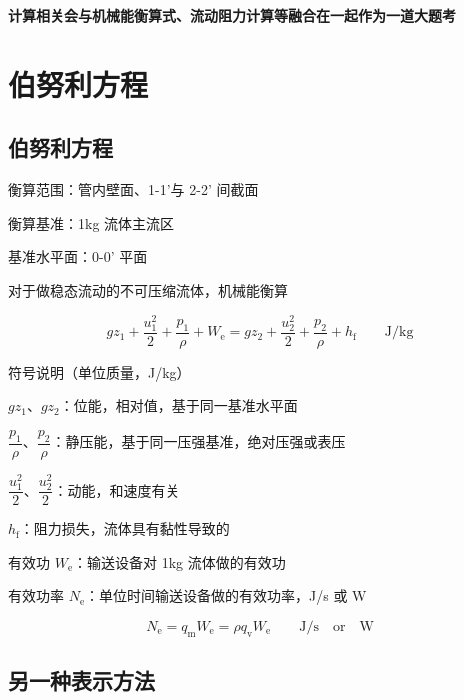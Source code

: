 \documentclass{book}
\DeclareRobustCommand{\bluebold}[1]{\textbf{\textcolor[rgb]{0.31,0.63,0.86}{#1}}}
\begin{document}
\bluebold{计算相关会与机械能衡算式、流动阻力计算等融合在一起作为一道大题考}

\chapter{伯努利方程}

\section{伯努利方程}

衡算范围：管内壁面、1-1'与 2-2' 间截面

衡算基准：1kg 流体主流区

基准水平面：0-0' 平面

对于做稳态流动的不可压缩流体，机械能衡算

\begin{equation}
gz_1 + \frac{u_1^2}{2} + \frac{p_1}{\rho} + W_\mathrm{e} = gz_2 + \frac{u_2^2}{2} + \frac{p_2}{\rho} + h_\mathrm{f}
\qquad \mathrm{J/kg}
\label{eq:bernoulli}
\end{equation}

符号说明（单位质量，J/kg）

\vspace{6pt}
$gz_1$、$gz_2$：位能，相对值，基于同一基准水平面

\vspace{6pt}
\(\dfrac{p_1}{\rho}\)、\(\dfrac{p_2}{\rho}\)：静压能，基于同一压强基准，绝对压强或表压

\vspace{6pt}
\(\dfrac{u_1^2}{2}\)、\(\dfrac{u_2^2}{2}\)：动能，和速度有关

\vspace{6pt}
$h_\mathrm{f}$：阻力损失，流体具有黏性导致的

\vspace{6pt}
有效功 $W_\mathrm{e}$：输送设备对 1kg 流体做的有效功

\vspace{6pt}
有效功率 $N_\mathrm{e}$：单位时间输送设备做的有效功率，J/s 或 W

\begin{equation}
N_\mathrm{e} = q_\text{m} W_\mathrm{e} = \rho q_\text{v} W_\mathrm{e}
\qquad \mathrm{J/s} \quad \text{or} \quad \mathrm{W}
\end{equation}

\section*{另一种表示方法}
\end{document}
